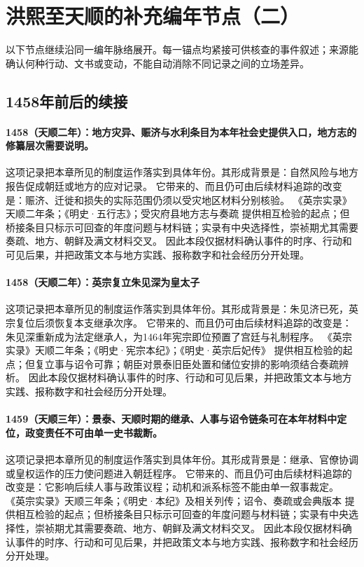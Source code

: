 \section{洪熙至天顺的补充编年节点（二）}
以下节点继续沿同一编年脉络展开。每一锚点均紧接可供核查的事件叙述；来源能确认何种行动、文书或变动，不能自动消除不同记录之间的立场差异。

\subsection{1458年前后的续接}

\paragraph{1458（天顺二年）：地方灾异、赈济与水利条目为本年社会史提供入口，地方志的修纂层次需要说明。} 这项记录把本章所见的制度运作落实到具体年份。其形成背景是：自然风险与地方报告促成朝廷或地方的应对记录。 它带来的、而且仍可由后续材料追踪的改变是：赈济、迁徙和损失的实际范围仍须以受灾地区材料分别核验。 《英宗实录》天顺二年条；《明史·五行志》；受灾府县地方志与奏疏 提供相互检验的起点；但桥接条目只标示可回查的年度问题与材料链；实录有中央选择性，崇祯期尤其需要奏疏、地方、朝鲜及满文材料交叉。 因此本段仅据材料确认事件的时序、行动和可见后果，并把政策文本与地方实践、报称数字和社会经历分开处理。

\paragraph{1458（天顺二年）：英宗复立朱见深为皇太子} 这项记录把本章所见的制度运作落实到具体年份。其形成背景是：朱见济已死，英宗复位后须恢复本支继承次序。 它带来的、而且仍可由后续材料追踪的改变是：朱见深重新成为法定继承人，为1464年宪宗即位预置了宫廷与礼制程序。 《英宗实录》天顺二年条；《明史·宪宗本纪》；《明史·英宗后妃传》 提供相互检验的起点；但复立事与诏令可靠；朝臣对景泰旧臣处置和储位安排的影响须结合奏疏辨析。 因此本段仅据材料确认事件的时序、行动和可见后果，并把政策文本与地方实践、报称数字和社会经历分开处理。

\paragraph{1459（天顺三年）：景泰、天顺时期的继承、人事与诏令链条可在本年材料中定位，政变责任不可由单一史书裁断。} 这项记录把本章所见的制度运作落实到具体年份。其形成背景是：继承、官僚协调或皇权运作的压力使问题进入朝廷程序。 它带来的、而且仍可由后续材料追踪的改变是：它影响后续人事与政策议程；动机和派系标签不能由单一叙事裁定。 《英宗实录》天顺三年条；《明史·本纪》及相关列传；诏令、奏疏或会典版本 提供相互检验的起点；但桥接条目只标示可回查的年度问题与材料链；实录有中央选择性，崇祯期尤其需要奏疏、地方、朝鲜及满文材料交叉。 因此本段仅据材料确认事件的时序、行动和可见后果，并把政策文本与地方实践、报称数字和社会经历分开处理。


